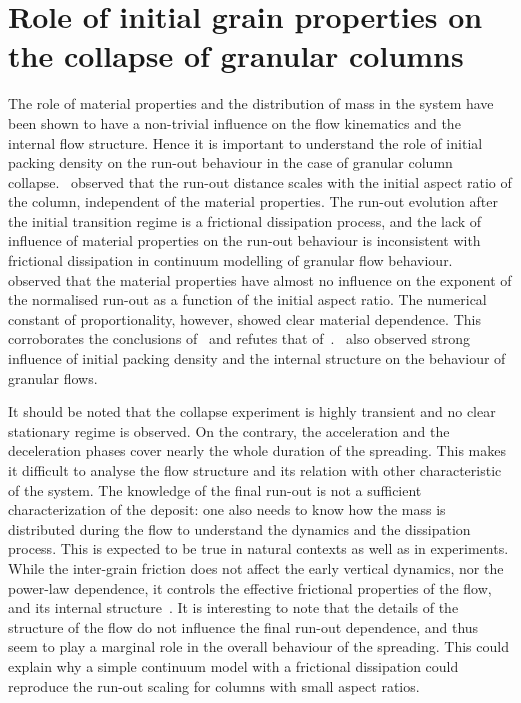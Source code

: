 \section{Role of initial grain properties on the collapse of granular columns}

The role of material properties and the distribution of mass in the system have 
been shown to have a non-trivial influence on the flow kinematics and the 
internal flow structure. Hence it is important to understand the role of 
initial packing density on the run-out behaviour in the case of granular column 
collapse.~\citet{Lube2005} observed that the run-out distance scales with the 
initial aspect ratio of the column, independent of the material properties. The 
run-out evolution after the initial transition regime is a frictional 
dissipation process, and the lack of influence of material properties on the 
run-out behaviour is inconsistent with frictional dissipation in continuum 
modelling of granular flow behaviour.~\citet{Balmforth2005} observed that the 
material properties have almost no influence on the exponent of the normalised 
run-out as a function of the initial aspect ratio. The numerical constant of 
proportionality, however, showed clear material dependence. This corroborates 
the conclusions of~\citet{Lajeunesse2004} and refutes that 
of~\citet{Lube2005}.~\citet{Daerr1999} also observed strong influence of 
initial packing density and the internal structure on the behaviour of 
granular flows. 


It should be noted that the collapse experiment is highly transient and no 
clear stationary regime is observed. On the contrary, the acceleration and the 
deceleration phases cover nearly the whole duration of the spreading. This 
makes it difficult to analyse the flow structure and its relation with other 
characteristic of the system. The knowledge of the final run-out is not a 
sufficient characterization of the deposit: one also needs to know how the mass 
is distributed during the flow to understand the dynamics and the dissipation 
process. This is expected to be true in natural contexts as well as in 
experiments. While the inter-grain friction does not affect the early vertical 
dynamics, nor the power-law dependence, it controls the effective frictional 
properties of the flow, and its internal structure~\citep{Staron2007a}. It is 
interesting to note that the details of the structure of the flow do not 
influence the final run-out dependence, and thus seem to play a marginal role 
in the overall behaviour of the spreading. This could explain why a simple 
continuum model with a frictional dissipation could reproduce the run-out 
scaling for columns with small aspect ratios. 

